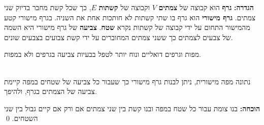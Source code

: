 \begin{center}
\end{center}

\textbf{הגדרה:}
\textbf{גרף}
הוא קבוצה של 
\textbf{צמתים}
$V$
וקבוצה של 
\textbf{קשתות}
$E$,
כך שכל קשת מחבר בדיוק שני צמתים.
\textbf{גרף מישורי}
הוא גרף בו שתי קשתות לא חותכות אחת את השניה. בגרף מישורי קטע מהמישור התחום על ידי קבוצה של קשתות נקרא 
\textbf{שטח}.
\textbf{צביעה}
של גרף מישורי היא השמה של צבעים לצמתים כך ששני צמתים המחוברים על ידי קשת צבועים בצבעים שונים.

%

מפות וגרפים דואליים ונוח יותר לטפל בבעיות צביעה בגרפים ולא במפות.
\begin{theorem}\mbox{}\\
נתונה מפה מישורית, ניתן לבנות גרף מישורי כך שעבור כל צביעה של שטחים במפה קיימת צביעה של הצמתים בגרף, ולהיפך.
\end{theorem}

\textbf{הוכחה:}
בנו צומת עבור כל שטח במפה ובנו קשת בין שני צמתים אם ורק אם קיים גבול בין שני השטחים.
\qed


